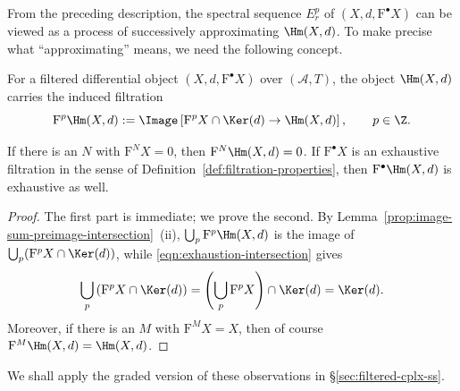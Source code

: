 From the preceding description, the spectral sequence $E_r^p$ of
$(X,d,\mathrm{F}^\bullet X)$ can be viewed as a process of successively
approximating $\Hm(X,d)$. To make precise what ``approximating'' means, we
need the following concept.

\begin{definition}\label{def:induced-filtration-H}
	For a filtered differential object $(X,d,\mathrm{F}^\bullet X)$ over
	$(\mathcal{A},T)$, the object $\Hm(X,d)$ carries the induced filtration
	\[ \mathrm{F}^p\Hm(X,d):=
	\Image\left[\mathrm{F}^pX\cap\Ker(d)\to\Hm(X,d)\right],
	\qquad p\in\Z. \]
\end{definition}

\begin{lemma}\label{prop:induced-filtration-H}
	If there is an $N$ with $\mathrm{F}^NX=0$, then
	$\mathrm{F}^N\Hm(X,d)=0$. If $\mathrm{F}^\bullet X$ is an exhaustive
	filtration in the sense of Definition~\ref{def:filtration-properties}, then
	$\mathrm{F}^\bullet\Hm(X,d)$ is exhaustive as well.
\end{lemma}
\begin{proof}
	The first part is immediate; we prove the second. By
	Lemma~\ref{prop:image-sum-preimage-intersection}~(ii),
	$\bigcup_p\mathrm{F}^p\Hm(X,d)$ is the image of
	$\bigcup_p(\mathrm{F}^pX\cap\Ker(d))$, while
	\eqref{eqn:exhaustion-intersection} gives
	\[ \bigcup_p\left(\mathrm{F}^pX\cap\Ker(d)\right)
	=\left(\bigcup_p\mathrm{F}^pX\right)\cap\Ker(d)=\Ker(d). \]
	Moreover, if there is an $M$ with $\mathrm{F}^MX=X$, then of course
	$\mathrm{F}^M\Hm(X,d)=\Hm(X,d)$.
\end{proof}

We shall apply the graded version of these observations in
\S\ref{sec:filtered-cplx-ss}.

